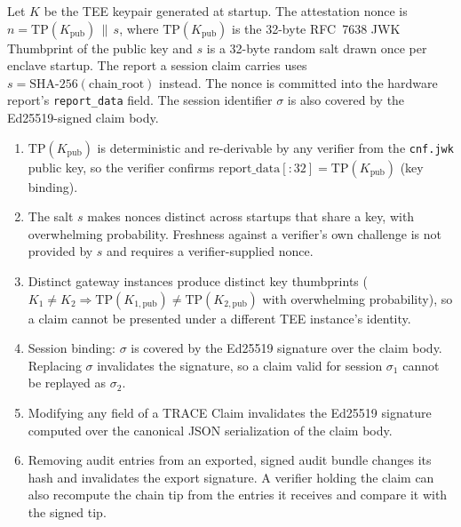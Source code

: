\begin{property}
\label{prop:nonce}
Let $K$ be the TEE keypair generated at startup. The attestation nonce is
$n = \text{TP}(K_{\text{pub}}) \,\|\, s$, where $\text{TP}(K_{\text{pub}})$ is the
32-byte RFC~7638 JWK Thumbprint of the public key and $s$ is a 32-byte random salt
drawn once per enclave startup. The report a session claim carries uses
$s = \text{SHA-256}(\text{chain\_root})$ instead. The nonce is committed into the hardware
report's \texttt{report\_data} field. The session identifier $\sigma$ is also covered by
the Ed25519-signed claim body.
\begin{enumerate}[leftmargin=1.5em,label=(\alph*)]
  \item $\text{TP}(K_{\text{pub}})$ is deterministic and re-derivable by any verifier
    from the \texttt{cnf.jwk} public key, so the verifier confirms
    $\text{report\_data}[{:}32] = \text{TP}(K_{\text{pub}})$ (key binding).
  \item The salt $s$ makes nonces distinct across startups that share a key, with
    overwhelming probability. Freshness against a verifier's own challenge is not
    provided by $s$ and requires a verifier-supplied nonce.
  \item Distinct gateway instances produce distinct key thumbprints
    ($K_1 \neq K_2 \Rightarrow \text{TP}(K_{1,\text{pub}}) \neq \text{TP}(K_{2,\text{pub}})$
    with overwhelming probability), so a claim cannot be presented under a different
    TEE instance's identity.
  \item Session binding: $\sigma$ is covered by the Ed25519 signature over the claim body.
    Replacing $\sigma$ invalidates the signature, so a claim valid for session $\sigma_1$
    cannot be replayed as $\sigma_2$.
  \item Modifying any field of a TRACE Claim invalidates the Ed25519 signature computed
    over the canonical JSON serialization of the claim body.
  \item Removing audit entries from an exported, signed audit bundle changes its hash and
    invalidates the export signature. A verifier holding the claim can also recompute the
    chain tip from the entries it receives and compare it with the signed tip.
\end{enumerate}
\end{property}

